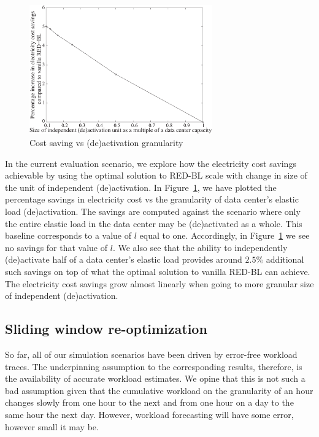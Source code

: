 \begin{figure}
    \centering
    \includegraphics[width=0.7\textwidth]{pics/s6.eps}
\caption{Cost saving vs (de)activation granularity}
\label{fig:granular-deactivation}
\end{figure}

In the current evaluation scenario, we explore how the electricity cost savings achievable by using the optimal solution to RED-BL scale with change in size of the unit of independent (de)activation. In Figure~\ref{fig:granular-deactivation}, we have plotted the percentage savings in electricity cost vs the granularity of data center's elastic load (de)activation. The savings are computed against the scenario where only the entire elastic load in the data center may be (de)activated as a whole. This baseline corresponds to a value of $l$ equal to one. Accordingly, in Figure~\ref{fig:granular-deactivation} we see no savings for that value of $l$. We also see that the ability to independently (de)activate half of a data center's elastic load provides around $2.5\%$ additional such savings on top of what the optimal solution to vanilla RED-BL can achieve. The electricity cost savings grow almost linearly when going to more granular size of independent (de)activation.

\subsection{Sliding window re-optimization}
So far, all of our simulation scenarios have been driven by error-free workload traces. The underpinning assumption to the corresponding results, therefore, is the availability of accurate workload estimates. We opine that this is not such a bad assumption given that the cumulative workload on the granularity of an hour changes slowly from one hour to the next and from one hour on a day to the same hour the next day. However, workload forecasting will have some error, however small it may be. 

